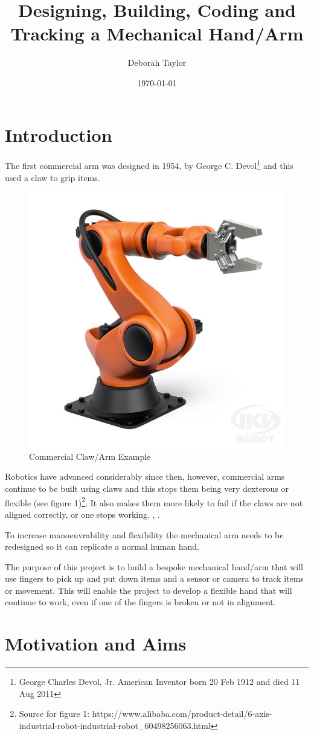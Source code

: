 \documentclass[progress]{cmpreport}
\title{Designing, Building, Coding and Tracking a Mechanical Hand/Arm}
\author{Deborah Taylor}
\date{\today}
\begin{document}
\section{Introduction}
The first commercial arm was designed in 1954, by George C. Devol\footnote{George Charles Devol, Jr. American Inventor born 20 Feb 1912 and died 11 Aug 2011} and this used a claw to grip items.

\begin{figure}
	\caption{Commercial Claw/Arm Example} 
	\includegraphics[width=0.7\linewidth]{photos/claw.jpg}  
\end{figure}
Robotics have advanced considerably since then, however, commercial arms continue to be built using claws and this stops them being very dexterous or flexible (see figure 1)\footnote{Source for figure 1: https://www.alibaba.com/product-detail/6-axis-industrial-robot-industrial-robot_60498256063.html}. It also makes them more likely to fail if the claws are not aligned correctly, or one stops working. \citep{devol}, \citep{grigorediscovering}.  

To increase manoeuvrability and flexibility the mechanical arm needs to be redesigned so it can replicate a normal human hand. 

The purpose of this project is to build a bespoke mechanical hand/arm that will use fingers to pick up and put down items and a sensor or camera to track items or movement. This will enable the project to develop a flexible hand that will continue to work, even if one of the fingers is broken or not in alignment. 


\section{Motivation and Aims}
\end{document}
